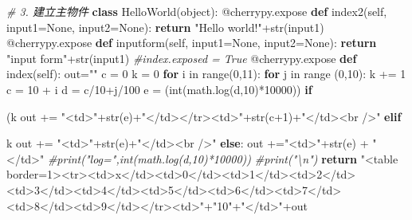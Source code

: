 \documentclass[]{article}
\newenvironment{Shaded}{}{}
\newcommand{\KeywordTok}[1]{\textcolor[rgb]{0.00,0.44,0.13}{\textbf{{#1}}}}
\newcommand{\DataTypeTok}[1]{\textcolor[rgb]{0.56,0.13,0.00}{{#1}}}
\newcommand{\DecValTok}[1]{\textcolor[rgb]{0.25,0.63,0.44}{{#1}}}
\newcommand{\StringTok}[1]{\textcolor[rgb]{0.25,0.44,0.63}{{#1}}}
\newcommand{\CommentTok}[1]{\textcolor[rgb]{0.38,0.63,0.69}{\textit{{#1}}}}
\newcommand{\OtherTok}[1]{\textcolor[rgb]{0.00,0.44,0.13}{{#1}}}
\newcommand{\NormalTok}[1]{{#1}}
\begin{document}
\begin{Shaded}
\begin{Highlighting}[]
\CommentTok{# 3. 建立主物件}
\KeywordTok{class} \NormalTok{HelloWorld(}\DataTypeTok{object}\NormalTok{):}
    \OtherTok{@cherrypy.expose}
    \KeywordTok{def} \NormalTok{index2(}\OtherTok{self}\NormalTok{, input1=}\OtherTok{None}\NormalTok{, input2=}\OtherTok{None}\NormalTok{):}
        \KeywordTok{return} \StringTok{"Hello world!"}\NormalTok{+}\DataTypeTok{str}\NormalTok{(input1)}
    \OtherTok{@cherrypy.expose}
    \KeywordTok{def} \NormalTok{inputform(}\OtherTok{self}\NormalTok{, input1=}\OtherTok{None}\NormalTok{, input2=}\OtherTok{None}\NormalTok{):}
        \KeywordTok{return} \StringTok{"input form"}\NormalTok{+}\DataTypeTok{str}\NormalTok{(input1)}
    \CommentTok{#index.exposed = True}
    \OtherTok{@cherrypy.expose}
    \KeywordTok{def} \NormalTok{index(}\OtherTok{self}\NormalTok{):}
        \NormalTok{out=}\StringTok{""}
        \NormalTok{c = }\DecValTok{0}
        \NormalTok{k = }\DecValTok{0}
        \KeywordTok{for} \NormalTok{i in }\DataTypeTok{range}\NormalTok{(}\DecValTok{0}\NormalTok{,}\DecValTok{11}\NormalTok{):}
            \KeywordTok{for} \NormalTok{j in }\DataTypeTok{range} \NormalTok{(}\DecValTok{0}\NormalTok{,}\DecValTok{10}\NormalTok{):}
                \NormalTok{k += }\DecValTok{1}
                \NormalTok{c = }\DecValTok{10} \NormalTok{+ i}
                \NormalTok{d = c/}\DecValTok{10}\NormalTok{+j/}\DecValTok{100}
                \NormalTok{e = (}\DataTypeTok{int}\NormalTok{(math.log(d,}\DecValTok{10}\NormalTok{)*}\DecValTok{10000}\NormalTok{))}
                \KeywordTok{if} \NormalTok{(k%}\DecValTok{10} \NormalTok{== }\DecValTok{0} \NormalTok{and k<=}\DecValTok{100}\NormalTok{):}
                    \NormalTok{out += }\StringTok{"<td>"}\NormalTok{+}\DataTypeTok{str}\NormalTok{(e)+}\StringTok{"</td></tr><td>"}\NormalTok{+}\DataTypeTok{str}\NormalTok{(c}\DecValTok{+1}\NormalTok{)+}\StringTok{"</td><br />"}
                \KeywordTok{elif} \NormalTok{k%}\DecValTok{100} \NormalTok{== }\DecValTok{0}\NormalTok{:}
                    \NormalTok{out += }\StringTok{"<td>"}\NormalTok{+}\DataTypeTok{str}\NormalTok{(e)+}\StringTok{"</td><br />"}
                \KeywordTok{else}\NormalTok{:}
                    \NormalTok{out +=}\StringTok{"<td>"}\NormalTok{+}\DataTypeTok{str}\NormalTok{(e) + }\StringTok{"</td>"}
                \CommentTok{#print("log=",int(math.log(d,10)*10000))}
            \CommentTok{#print("\textbackslash{}n")}
        \KeywordTok{return} \StringTok{"<table border=1><tr><td>x</td><td>0</td><td>1</td><td>2</td><td>3</td><td>4</td><td>5</td><td>6</td><td>7</td><td>8</td><td>9</td></tr><td>"}\NormalTok{+}\StringTok{"10"}\NormalTok{+}\StringTok{"</td>"}\NormalTok{+out}
 
}}
\end{Highlighting}
\end{Shaded}
\end{document}
